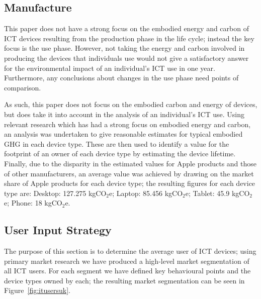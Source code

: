\documentclass[conference]{IEEEtran}
\begin{document}
\subsection{Manufacture}


This paper does not have a strong focus on the embodied energy and
carbon of ICT devices resulting from the production phase in the life
cycle; instead the key focus is the use phase. However, not taking the
energy and carbon involved in producing the devices that individuals
use would not give a satisfactory answer for the environmental impact
of an individual's ICT use in one year. Furthermore, any conclusions
about changes in the use phase need points of comparison.

As such, this paper does not focus on the
embodied carbon and energy of devices, but does take it into account
in the analysis of an individual's ICT use. Using relevant
research which has had a strong focus on embodied energy and carbon,
an analysis was undertaken to give reasonable estimates for typical
embodied GHG in each device type. These are then used to identify a
value for the footprint of an owner of each device type by estimating
the device lifetime. Finally, due to the disparity in the estimated
values for Apple products and those of other manufacturers, an average
value was achieved by drawing on the market share of Apple products
for each device type; the resulting figures for each device type
are: Desktop: 127.275 kgCO$_2$e; Laptop: 85.456 kgCO$_2$e; Tablet:
45.9 kgCO$_2$e; Phone: 18 kgCO$_2$e.

\subsection{User Input Strategy}

The purpose of this section is to determine the average user of ICT
devices; using primary market research we have produced a high-level
market segmentation of all ICT users. For each segment we have defined
key behavioural points and the device types owned by each; the
resulting market segmentation can be seen in
Figure~\ref{fig:itusersuk}.
\end{document}
